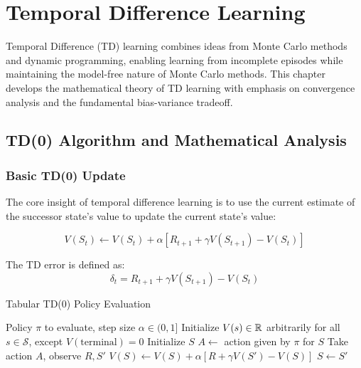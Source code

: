 \chapter{Temporal Difference Learning}
\label{ch:temporal-difference}

Temporal Difference (TD) learning combines ideas from Monte Carlo methods and dynamic programming, enabling learning from incomplete episodes while maintaining the model-free nature of Monte Carlo methods. This chapter develops the mathematical theory of TD learning with emphasis on convergence analysis and the fundamental bias-variance tradeoff.

\section{TD(0) Algorithm and Mathematical Analysis}

\subsection{Basic TD(0) Update}

The core insight of temporal difference learning is to use the current estimate of the successor state's value to update the current state's value:

\begin{equation}
V(S_t) \leftarrow V(S_t) + \alpha [R_{t+1} + \gamma V(S_{t+1}) - V(S_t)]
\end{equation}

The TD error is defined as:
\begin{equation}
\delta_t = R_{t+1} + \gamma V(S_{t+1}) - V(S_t)
\end{equation}

\begin{algorithm}
\caption{Tabular TD(0) Policy Evaluation}
\begin{algorithmic}
\REQUIRE Policy $\pi$ to evaluate, step size $\alpha \in (0,1]$
\STATE Initialize $V(s) \in \mathbb{R}$ arbitrarily for all $s \in \mathcal{S}$, except $V(\text{terminal}) = 0$
\REPEAT
    \STATE Initialize $S$
    \REPEAT
        \STATE $A \leftarrow$ action given by $\pi$ for $S$
        \STATE Take action $A$, observe $R, S'$
        \STATE $V(S) \leftarrow V(S) + \alpha[R + \gamma V(S') - V(S)]$
        \STATE $S \leftarrow S'$
\end{algorithmic}
\end{algorithm}

